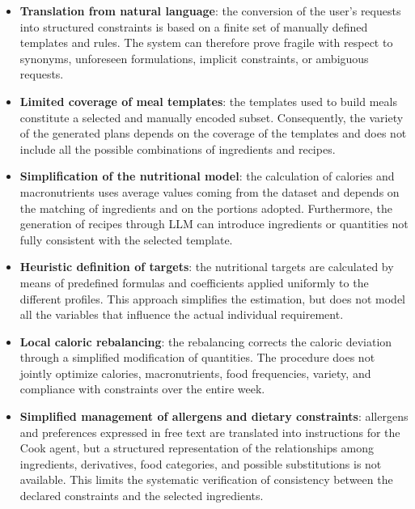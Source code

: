 \documentclass[12pt,a4paper]{article}
\begin{document}
\sloppy
\begin{itemize}
    \item \textbf{Translation from natural language}: the conversion of the user's requests into structured constraints is based on
    a finite set of manually defined templates and rules. The system can
    therefore prove fragile with respect to synonyms, unforeseen formulations,
    implicit constraints, or ambiguous requests.

    \item \textbf{Limited coverage of meal templates}: the templates used to build meals constitute a selected and manually encoded
    subset. Consequently, the variety of the generated plans
    depends on the coverage of the templates and does not include all the
    possible combinations of ingredients and recipes.

    \item \textbf{Simplification of the nutritional model}: the calculation of calories and macronutrients uses average values coming from the
    dataset and depends on the matching of ingredients and on the portions
    adopted. Furthermore, the generation of recipes through LLM can introduce
    ingredients or quantities not fully consistent with the selected template.

    \item \textbf{Heuristic definition of targets}: the nutritional targets are calculated by means of predefined formulas and coefficients
    applied uniformly to the different profiles. This approach
    simplifies the estimation, but does not model all the variables that influence 
    the actual individual requirement.

    \item \textbf{Local caloric rebalancing}: the rebalancing corrects the caloric deviation through a simplified modification
    of quantities. The procedure does not jointly optimize
    calories, macronutrients, food frequencies, variety, and compliance with
    constraints over the entire week.

    \item \textbf{Simplified management of allergens and dietary constraints}: allergens and preferences expressed in free text are translated into
    instructions for the Cook agent, but a structured representation
    of the relationships among ingredients, derivatives, food categories,
    and possible substitutions is not available. This limits the systematic verification of consistency
    between the declared constraints and the selected ingredients.
\end{itemize}
\fussy
\end{document}
